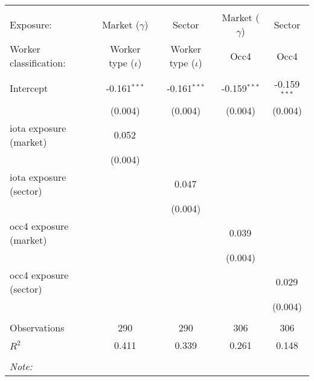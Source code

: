 \begin{tabular}{@{\extracolsep{5pt}}lcccc}
\\[-1.8ex]\hline
\hline \\[-1.8ex]
\hline \\[-1.8ex]
 Exposure: & Market ($\gamma$) & Sector & Market ($\gamma$) & Sector \\
 Worker classification: & Worker type ($\iota$) & Worker type ($\iota$) & Occ4 & Occ4 \\
 \hline &  &  &  &  \\
 Intercept & -0.161$^{***}$ & -0.161$^{***}$ & -0.159$^{***}$ & -0.159$^{***}$ \\
  & (0.004) & (0.004) & (0.004) & (0.004) \\
 iota exposure (market) & 0.052$^{}$ & & & \\
  & (0.004) & & & \\
 iota exposure (sector) & & 0.047$^{}$ & & \\
  & & (0.004) & & \\
 occ4 exposure (market) & & & 0.039$^{}$ & \\
  & & & (0.004) & \\
 occ4 exposure (sector) & & & & 0.029$^{}$ \\
  & & & & (0.004) \\
\hline \\[-1.8ex]
 Observations & 290 & 290 & 306 & 306 \\
 $R^2$ & 0.411 & 0.339 & 0.261 & 0.148 \\
\hline
\hline \\[-1.8ex]
\textit{Note:}\end{tabular}